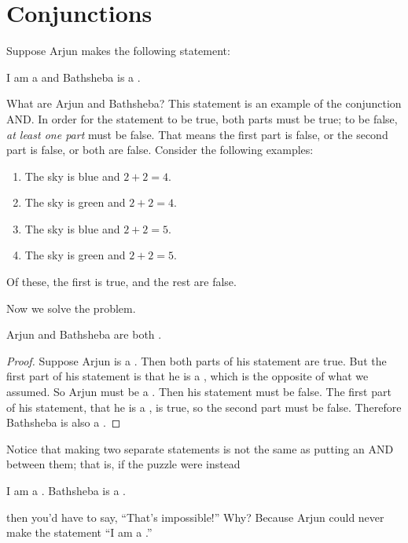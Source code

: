 \documentclass{tufte-book}
\begin{document}


\section{Conjunctions}
\label{sec:conjunctions}

Suppose Arjun makes the following statement:
\begin{example}
  \begin{dialogue}
     I am a \knave and Bathsheba is a \knight.
  \end{dialogue}
\end{example}

What are Arjun and Bathsheba? This statement is an example of the conjunction AND. In order for the statement to be true, both parts must be true; to be false, \emph{at least one part} must be false. That means the first part is false, or the second part is false, or both are false. Consider the following examples:
\begin{enumerate}
    \item The sky is blue and $2 + 2 = 4$.
    \item The sky is green and $2 + 2 = 4$.
    \item The sky is blue and $2 + 2 = 5$.
    \item The sky is green and $2 + 2 = 5$.
\end{enumerate}
Of these, the first is true, and the rest are false.

Now we solve the problem.
\begin{claim}
  Arjun and Bathsheba are both \knaves.
\end{claim}

\begin{proof}
  Suppose Arjun is a \knight. Then both parts of his statement are true. But the first part of his statement is that he is a \knave, which is the opposite of what we assumed. So Arjun must be a \knave. Then his statement must be false. The first part of his statement, that he is a \knave, is true, so the second part must be false. Therefore Bathsheba is also a \knave.
\end{proof}

Notice that making two separate statements is not the same as putting an AND between them; that is, if the puzzle were instead
\begin{example}
  \begin{dialogue}
     I am a \knave. Bathsheba is a \knight.
  \end{dialogue}
\end{example}
then you'd have to say, ``That's impossible!'' Why? Because Arjun could never make the statement ``I am a \knave.''
\end{document}
